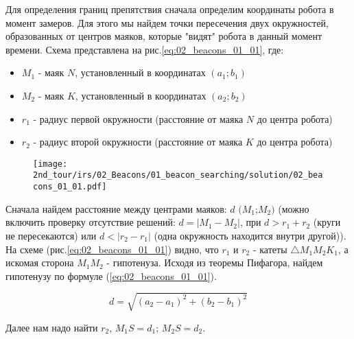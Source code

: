 \solutionSection

Для определения границ препятствия сначала определим координаты робота в момент замеров. Для этого мы найдем точки пересечения двух окружностей, образованных от центров маяков, которые "видят" робота в данный момент времени. Схема представлена на рис.\ref{eq:02_beacons_01_01}, где: \\

\begin{itemize}
	\item $M_1$ - маяк $N$, установленный в координатах $(a_1; b_1)$
	\item $M_2$ - маяк $K$, установленный в координатах $(a_2; b_2)$
	\item $r_1$ - радиус первой окружности (расстояние от маяка $N$ до центра робота)
	\item $r_2$ - радиус второй окружности (расстояние от маяка $K$ до центра робота)
\end{itemize}

\begin{figure}[h!]
	\centering
	\texttt{[image: 2nd\_tour/irs/02\_Beacons/01\_beacon\_searching/solution/02\_beacons\_01\_01.pdf]}
	\caption{}
	\label{fig:02_beacons_01_01}
\end{figure}

Сначала найдем расстояние между центрами маяков: $d$ $(M_1$;$M_2)$ (можно включить проверку отсутствие решений: $d = |M_1 - M_2|$, при $d > r_1 + r_2$ (круги не пересекаются) или $d < |r_2 - r_1|$ (одна окружность находится внутри другой)).
На схеме (рис.\ref{eq:02_beacons_01_01}) видно, что $r_1$ и $r_2$ - катеты $\triangle M_1M_2K_1$, а искомая сторона $M_1M_2$ - гипотенуза. Исходя из теоремы Пифагора, найдем гипотенузу по формуле (\ref{eq:02_beacons_01_01}).

\begin{equation}
	d = \sqrt{{(a_2 - a_1)}^2 + {(b_2 - b_1)}^2}
	\label{eq:02_beacons_01_01}
\end{equation}

Далее нам надо найти $r_2$, $M_1S = d_1$; $M_2S = d_2$.

